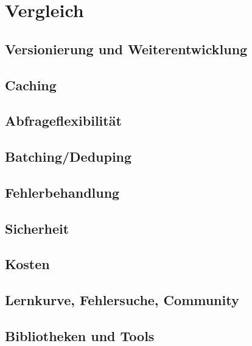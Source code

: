 \section{Vergleich}

\subsection{Versionierung und Weiterentwicklung}

\subsection{Caching}

\subsection{Abfrageflexibilität}

\subsection{Batching/Deduping}

\subsection{Fehlerbehandlung}

\subsection{Sicherheit}

\subsection{Kosten}

\subsection{Lernkurve, Fehlersuche, Community}

\subsection{Bibliotheken und Tools}
